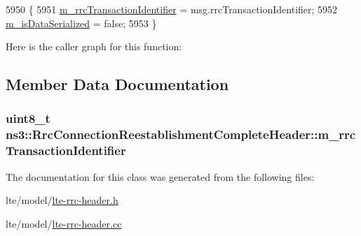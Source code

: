\begin{DoxyCode}
5950 \{
5951   \hyperlink{classns3_1_1RrcConnectionReestablishmentCompleteHeader_a759dcb11e1319b0950d6b1a607e8b802}{m\_rrcTransactionIdentifier} = msg.rrcTransactionIdentifier;
5952   \hyperlink{classns3_1_1Asn1Header_ae39d42f09e8ec85d8180843625fc92ba}{m\_isDataSerialized} = \textcolor{keyword}{false};
5953 \}
\end{DoxyCode}


Here is the caller graph for this function\+:




\subsection{Member Data Documentation}
\subsubsection[{\texorpdfstring{m\+\_\+rrc\+Transaction\+Identifier}{m_rrcTransactionIdentifier}}]{\setlength{\rightskip}{0pt plus 5cm}uint8\+\_\+t ns3\+::\+Rrc\+Connection\+Reestablishment\+Complete\+Header\+::m\+\_\+rrc\+Transaction\+Identifier\hspace{0.3cm}{\ttfamily [private]}}\hypertarget{classns3_1_1RrcConnectionReestablishmentCompleteHeader_a759dcb11e1319b0950d6b1a607e8b802}{}\label{classns3_1_1RrcConnectionReestablishmentCompleteHeader_a759dcb11e1319b0950d6b1a607e8b802}


The documentation for this class was generated from the following files\+:\begin{DoxyCompactItemize}
\item 
lte/model/\hyperlink{lte-rrc-header_8h}{lte-\/rrc-\/header.\+h}\item 
lte/model/\hyperlink{lte-rrc-header_8cc}{lte-\/rrc-\/header.\+cc}\end{DoxyCompactItemize}
